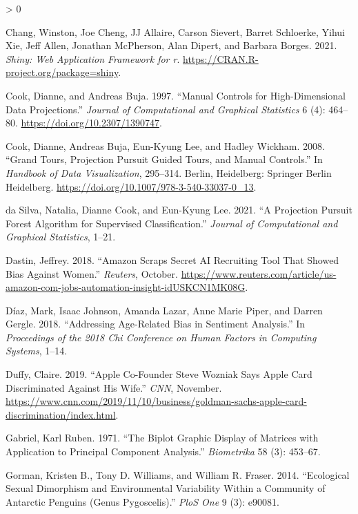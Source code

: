 \documentclass[
]{article}
\newlength{\cslhangindent}
\newenvironment{CSLReferences}[2] %
 {%
  \setlength{\parindent}{0pt}
  \ifodd #1 \everypar{\setlength{\hangindent}{\cslhangindent}}\ignorespaces\fi
  \ifnum #2 > 0
  \setlength{\parskip}{#2\baselineskip}
  \fi
 }%
 {}
\begin{document}
\begin{CSLReferences}{1}{0}
\leavevmode\hypertarget{ref-chang_shiny_2021}{}%
Chang, Winston, Joe Cheng, JJ Allaire, Carson Sievert, Barret Schloerke, Yihui Xie, Jeff Allen, Jonathan McPherson, Alan Dipert, and Barbara Borges. 2021. \emph{Shiny: Web Application Framework for r}. \url{https://CRAN.R-project.org/package=shiny}.

\leavevmode\hypertarget{ref-cook_manual_1997}{}%
Cook, Dianne, and Andreas Buja. 1997. {``Manual {Controls} for {High}-{Dimensional} {Data} {Projections}.''} \emph{Journal of Computational and Graphical Statistics} 6 (4): 464--80. \url{https://doi.org/10.2307/1390747}.

\leavevmode\hypertarget{ref-cook_grand_2008}{}%
Cook, Dianne, Andreas Buja, Eun-Kyung Lee, and Hadley Wickham. 2008. {``Grand {Tours}, {Projection} {Pursuit} {Guided} {Tours}, and {Manual} {Controls}.''} In \emph{Handbook of {Data} {Visualization}}, 295--314. Berlin, Heidelberg: Springer Berlin Heidelberg. \url{https://doi.org/10.1007/978-3-540-33037-0_13}.

\leavevmode\hypertarget{ref-da_silva_projection_2021}{}%
da Silva, Natalia, Dianne Cook, and Eun-Kyung Lee. 2021. {``A {Projection} {Pursuit} {Forest} {Algorithm} for {Supervised} {Classification}.''} \emph{Journal of Computational and Graphical Statistics}, 1--21.

\leavevmode\hypertarget{ref-dastin_amazon_2018}{}%
Dastin, Jeffrey. 2018. {``Amazon Scraps Secret {AI} Recruiting Tool That Showed Bias Against Women.''} \emph{Reuters}, October. \url{https://www.reuters.com/article/us-amazon-com-jobs-automation-insight-idUSKCN1MK08G}.

\leavevmode\hypertarget{ref-diaz_addressing_2018}{}%
Díaz, Mark, Isaac Johnson, Amanda Lazar, Anne Marie Piper, and Darren Gergle. 2018. {``Addressing Age-Related Bias in Sentiment Analysis.''} In \emph{Proceedings of the 2018 Chi Conference on Human Factors in Computing Systems}, 1--14.

\leavevmode\hypertarget{ref-duffy_apple_2019}{}%
Duffy, Claire. 2019. {``Apple Co-Founder {Steve} {Wozniak} Says {Apple} {Card} Discriminated Against His Wife.''} \emph{CNN}, November. \url{https://www.cnn.com/2019/11/10/business/goldman-sachs-apple-card-discrimination/index.html}.

\leavevmode\hypertarget{ref-gabriel_biplot_1971}{}%
Gabriel, Karl Ruben. 1971. {``The Biplot Graphic Display of Matrices with Application to Principal Component Analysis.''} \emph{Biometrika} 58 (3): 453--67.

\leavevmode\hypertarget{ref-gorman_ecological_2014}{}%
Gorman, Kristen B., Tony D. Williams, and William R. Fraser. 2014. {``Ecological Sexual Dimorphism and Environmental Variability Within a Community of {Antarctic} Penguins (Genus {Pygoscelis}).''} \emph{PloS One} 9 (3): e90081.


\end{CSLReferences}
\end{document}
